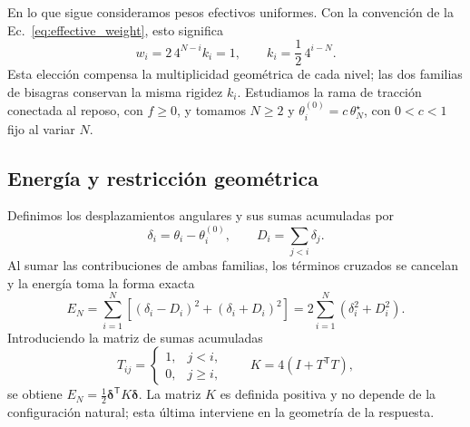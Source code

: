 \documentclass[11pt,a4paper]{article}
\begin{document}
En lo que sigue consideramos pesos efectivos uniformes. Con la
convención de la Ec.~\eqref{eq:effective_weight}, esto significa
\begin{equation}
w_i=2\,4^{N-i}k_i=1,
\qquad k_i=\frac12\,4^{i-N}.
\label{eq:uniform_weights}
\end{equation}
Esta elección compensa la multiplicidad geométrica de cada nivel;
las dos familias de bisagras conservan la misma rigidez $k_i$.
Estudiamos la rama de tracción conectada al reposo, con $f\geq0$,
y tomamos $N\geq2$ y $\theta_i^{(0)}=c\,\theta_N^\star$,
con $0<c<1$ fijo al variar $N$.

\subsection{Energía y restricción geométrica}

Definimos los desplazamientos angulares y sus sumas acumuladas por
\begin{equation}
\delta_i=\theta_i-\theta_i^{(0)},
\qquad D_i=\sum_{j<i}\delta_j.
\end{equation}
Al sumar las contribuciones de ambas familias, los términos cruzados
se cancelan y la energía toma la forma exacta
\begin{equation}
\boxed{
E_N=\sum_{i=1}^{N}\left[(\delta_i-D_i)^2+(\delta_i+D_i)^2\right]
=2\sum_{i=1}^{N}(\delta_i^2+D_i^2).
}
\label{eq:uniform_energy_matrix}
\end{equation}
Introduciendo la matriz de sumas acumuladas
\begin{equation}
T_{ij}=\begin{cases}1,&j<i,\\0,&j\geq i,\end{cases}
\qquad K=4(I+T^{\mathsf T}T),
\label{eq:K_uniform}
\end{equation}
se obtiene $E_N=\tfrac12\boldsymbol\delta^{\mathsf T}K\boldsymbol\delta$.
La matriz $K$ es definida positiva y no depende de la configuración
natural; esta última interviene en la geometría de la respuesta.
\end{document}
